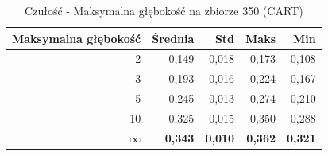 \begin{table}[htbp]
\centering
\small
\setlength{\tabcolsep}{6pt}
\renewcommand{\arraystretch}{1.2}
\caption{Czułość - Maksymalna głębokość na zbiorze 350 (CART)}
\label{tab:CART_max_depth_350_recall}
\begin{tabular}{r|r|r|r|r}
\toprule
Maksymalna głębokość & Średnia & Std & Maks & Min \\
\hline
2 & 0,149 & 0,018 & 0,173 & 0,108 \\
3 & 0,193 & 0,016 & 0,224 & 0,167 \\
5 & 0,245 & 0,013 & 0,274 & 0,210 \\
10 & 0,325 & 0,015 & 0,350 & 0,288 \\
\textbf{$\infty$} & \textbf{0,343} & \textbf{0,010} & \textbf{0,362} & \textbf{0,321} \\
\bottomrule
\end{tabular}
\end{table}